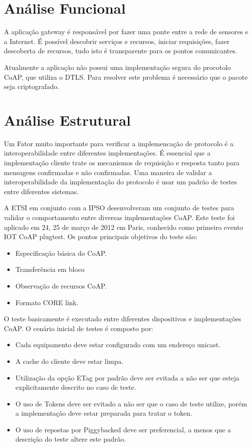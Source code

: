 \section{An\'alise Funcional}

A aplica\c{c}\~ao gateway \'e respons\'avel por fazer uma ponte entre a rede de sensores e a Internet. \'E poss\'ivel descobrir servi\c{c}os e recursos, iniciar requisi\c{c}\~oes, fazer descoberta de recursos, tudo  isto \'e transparente para os pontos comunicantes. 

Atualmente a aplica\c{c}\~ao n\~ao possui uma implementa\c{c}\~ao segura do procotolo CoAP, que utiliza o DTLS. Para resolver este problema \'e necess\'ario que o pacote seja criptografado.

\section{An\'alise Estrutural}

Um Fator muito importante para verificar a implemenca\c{c}\~ao de protocolo \'e a interoperabilidade entre diferentes implementa\c{c}\~oes. \'E essencial que a implementa\c{c}\~ao cliente trate os mecanismos de requisi\c{c}\~ao e resposta tanto para mensagens confirmadas e n\~ao confirmadas. Uma maneira de validar a interoperabilidade da implementa\c{c}\~ao do protocolo \'e usar um padr\~ao de testes entre diferentes sistemas.

A ETSI em conjunto com a IPSO desenvolveram um conjunto de testes para validar o comportamento entre diversas implementa\c{c}\~oes CoAP. Este teste foi aplicado em 24, 25 de mar\c{c}o de 2012 em Paris, conhecido como primeiro evento IOT CoAP plugtest.  Os pontos principais objetivos do teste s\~ao:

\begin{itemize}
\item Especifica\c{c}\~ao b\'asica do CoAP.
\item Transfer\^encia em bloco
\item Observa\c{c}\~ao de recursos CoAP.
\item Formato CORE link.
\end{itemize}

O teste basicamente \'e executado entre diferentes dispositivos e implementa\c{c}\~oes CoAP. O cen\'ario inicial de testes \'e composto por:
\begin{itemize}
    \item Cada equipamento deve estar configurado com um endere\c{c}o unicast.
    \item A cache do cliente deve estar limpa.
    \item Utiliza\c{c}\~ao da op\c{c}\~ao ETag por padr\~ao deve ser evitada a n\~ao ser que esteja explicitamente descrito no caso de teste. 
    \item O uso de Tokens deve ser evitado a n\~ao ser que o caso de teste utilize, por\'em a implementa\c{c}\~ao deve estar preparada para tratar o token.
    \item O uso de repostas por Piggybacked deve ser preferencial, a menos que a descri\c{c}\~ao do teste altere este padr\~ao.
\end{itemize}

